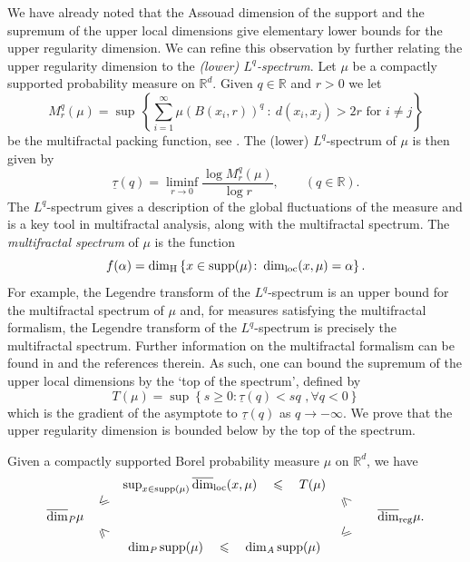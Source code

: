 We have already noted that the Assouad dimension of the support and the supremum of the upper local dimensions give elementary lower bounds for the upper regularity dimension.  We can refine this observation by further relating the upper regularity dimension to the \textit{(lower) $L^q$-spectrum}.  Let $\mu$ be a compactly supported probability measure on $\mathbb{R}^d$.  Given $q \in \mathbb{R}$ and $r>0$ we let
\[
M_r^q(\mu) = \sup  \, \left \{ \sum_{i=1}^\infty  \mu(B(x_i,r))^q \ : \ d(x_i, x_j) > 2r \text{ for $i \neq j$} \right\}
\]
be the multifractal packing function, see \cite{olsenformalism}.  The  (lower) $L^q$-spectrum of $\mu$ is then given by
\[
\underline{\tau}(q)= \liminf_{r\rightarrow 0} \frac{\log M_r^q(\mu) }{\log r}, \qquad (q\in \mathbb{R}).
\]
The $L^q$-spectrum gives a description of the global fluctuations of the measure and is a key tool in multifractal analysis, along with the multifractal spectrum. The \textit{multifractal spectrum} of $\mu$ is the function 
\[
f(\alpha) = \dim_{\text{H}} \left\{ x\in \text{supp} (\mu) \colon \dim_{\textup{loc}}(x,\mu) = \alpha \right\}.
\]
For example, the Legendre transform of the $L^q$-spectrum is an upper bound for the multifractal spectrum of $\mu$ and, for measures satisfying the multifractal formalism, the Legendre transform of the $L^q$-spectrum is precisely the multifractal spectrum. Further information on the multifractal formalism can be found in \cite{olsenformalism} and the references therein. As such, one can bound the supremum of the upper local dimensions by the `top of the spectrum', defined by
\[
T(\mu)=\sup \left\{ s \ge 0 \colon \underline{\tau}(q) < sq \, \,, \forall q<0 \right\}
\]
which is the gradient of the asymptote to $\underline{\tau}(q)$ as $q \rightarrow - \infty$.  We prove that the upper regularity dimension is bounded below by the top of the spectrum.  


\begin{theorem} \label{ch-upper-reg:relationships}
	Given a compactly supported Borel probability measure $\mu$ on $\mathbb{R}^d$, we have
	\[
	\begin{array}{ccccccccccc}
	&&                  \sup_ {x\in \mathrm{supp}(\mu)}  \overline{\dim}_{\mathrm{loc}}(x,\mu)   \quad  \leq    \quad   T(\mu)                        & & &    \\
	&                       \rotatebox[origin=c]{45}{$\leq$}          & &              \rotatebox[origin=c]{315}{$\leq$} & &   \\
	\overline{\dim}_\text{\emph{P}} \mu                                            & &        &&                  & \r.\\
	&                \rotatebox[origin=c]{315}{$\leq$}              &&           \rotatebox[origin=c]{45}{$\leq$} & &  \\
	&&                                            \dim_\text{\emph{P}} \mathrm{supp}(\mu)      \quad  \leq   \quad  \dim_\text{\emph{A}} \mathrm{supp}(\mu)                           & & &  
	\end{array}
	\]
\end{theorem}

